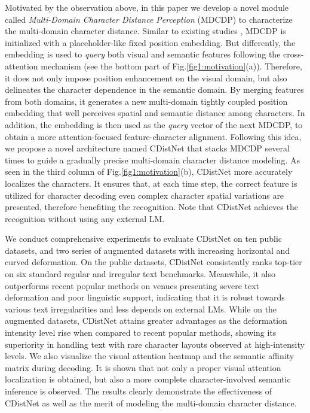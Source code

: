 Motivated by the observation above, in this paper we develop a novel module called \emph{Multi-Domain Character Distance Perception} (MDCDP) to characterize the multi-domain character distance. Similar to existing studies \citep{vaswani2017transformer, yue2020robustscanner}, MDCDP is initialized with a placeholder-like fixed position embedding. But differently, the embedding is used to \emph{query} both visual and semantic features following the cross-attention mechanism (see the bottom part of Fig.\ref{fig1:motivation}(a)). Therefore, it does not only impose position enhancement on the visual domain, but also delineates the character dependence in the semantic domain. By merging features from both domains, it generates a new multi-domain tightly coupled position embedding that well perceives spatial and semantic distance among characters. In addition, the embedding is then used as the \emph{query} vector of the next MDCDP, to obtain a more attention-focused feature-character alignment. Following this idea, we propose a novel architecture named CDistNet that stacks MDCDP several times to guide a gradually precise multi-domain character distance modeling. As seen in the third column of Fig.\ref{fig1:motivation}(b), CDistNet more accurately localizes the characters. It ensures that, at each time step, the correct feature is utilized for character decoding even complex character spatial variations are presented, therefore benefiting the recognition. Note that CDistNet achieves the recognition without using any external LM.
 

We conduct comprehensive experiments to evaluate CDistNet on ten public datasets, and two series of augmented datasets with increasing horizontal and curved deformation. On the public datasets, CDistNet consistently ranks top-tier on six standard regular and irregular text benchmarks. Meanwhile, it also outperforms recent popular methods on venues presenting severe text deformation and poor linguistic support, indicating that it is robust towards various text irregularities and less depends on external LMs. While on the augmented datasets, CDistNet attains greater advantages as the deformation intensity level rise when compared to recent popular methods, showing its superiority in handling text with rare character layouts observed at high-intensity levels. We also visualize the visual attention heatmap and the semantic affinity matrix during decoding. It is shown that not only a proper visual attention localization is obtained, but also a more complete character-involved semantic inference is observed. The results clearly demonstrate the effectiveness of CDistNet as well as the merit of modeling the multi-domain character distance.


